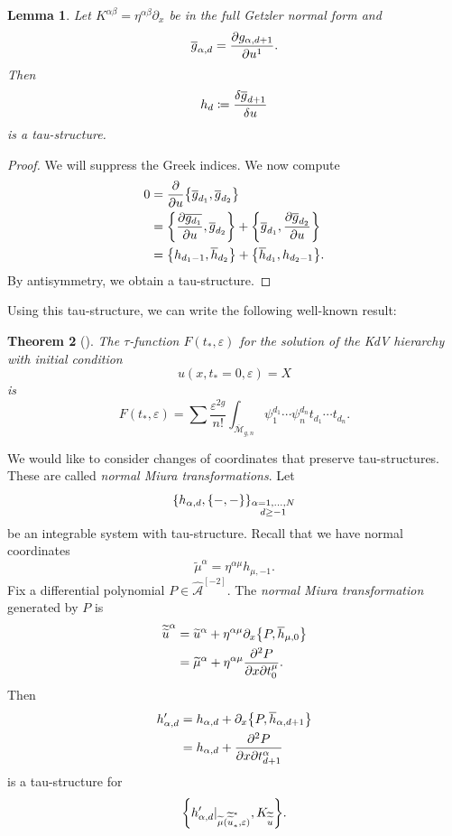 \documentclass[leqno, openany]{memoir}
\newtheorem{thm}{Theorem}[section]
\newtheorem{lem}[thm]{Lemma}
\theoremstyle{definition}
\theoremstyle{remark}
\theoremstyle{plain}
\theoremstyle{definition}
\theoremstyle{remark}
\newcommand{\ep}{\varepsilon}
\newcommand{\mc}[1]{\mathcal{#1}}
\newcommand{\ol}[1]{\overline{#1}}
\newcommand{\wt}[1]{\widetilde{#1}}
\newcommand{\wh}[1]{\widehat{#1}}
\begin{document}
\begin{lem}
    Let $K^{\alpha\beta} = \eta^{\alpha\beta} \partial_x$ be in the full Getzler normal form and
    \[ \ol{g}_{\alpha,d} = \pdv{g_{\alpha,d+1}}{u^1}. \]
    Then 
    \[ h_d \coloneqq \fdv{\ol{g}_{d+1}}{u} \]
    is a tau-structure.
\end{lem}

\begin{proof}
    We will suppress the Greek indices. We now compute
    \begin{align*}
        0 &= \pdv{u} \qty{\ol{g}_{d_1}, \ol{g}_{d_2}} \\
        &= \qty{\pdv{\ol{g_{d_1}}}{u}, \ol{g}_{d_2}} + \qty{\ol{g}_{d_1}, \pdv{\ol{g}_{d_2}}{u}} \\
        &= \qty{h_{d_1-1}, \ol{h}_{d_2}} + \qty{\ol{h}_{d_1}, h_{d_2-1}}.
    \end{align*}
    By antisymmetry, we obtain a tau-structure.
\end{proof}

Using this tau-structure, we can write the following well-known result:
\begin{thm}[\cite{wittenconj}]
    The $\tau$-function $F(t_*, \ep)$ for the solution of the KdV hierarchy with initial condition
    \[ u(x, t_* = 0, \ep) = X \]
    is
    \[ F(t_*, \ep) = \sum \frac{\ep^{2g}}{n!} \int_{\ol{\mc{M}}_{g, n}} \psi_1^{d_1} \cdots \psi_n^{d_n} t_{d_1} \cdots t_{d_n}. \]
\end{thm}

We would like to consider changes of coordinates that preserve tau-structures. These are called \textit{normal Miura transformations}. Let 
\[ \qty{h_{\alpha,d}, \qty{-,-}}_{\substack{\alpha = 1,\ldots,N \\ d \geq -1}} \]
be an integrable system with tau-structure. Recall that we have normal coordinates
\[ \wt{\mu}^{\alpha} = \eta^{\alpha \mu} h_{\mu,-1}. \]
Fix a differential polynomial $P \in \wh{\mc{A}}^{[-2]}$. The \textit{normal Miura transformation} generated by $P$ is
\begin{align*}
    \wt{\wt{u}}^{\alpha} &= \wt{u}^{\alpha} + \eta^{\alpha \mu} \partial_x \qty{P, \ol{h}_{\mu, 0}} \\
    &= \wt{\mu}^{\alpha} + \eta^{\alpha \mu} \pdv{P}{x}{t_0^{\mu}}.
\end{align*}
Then
\begin{align*}
    h'_{\alpha,d} &= h_{\alpha,d} + \partial_x \qty{P, \ol{h}_{\alpha,d+1}} \\
    &= h_{\alpha,d} + \pdv{P}{x}{t_{d+1}^{\alpha}}
\end{align*}
is a tau-structure for
\[ \qty{h'_{\alpha, d} |_{\wt{\mu}(\wt{\wt{u}}_*^*, \ep)}, K_{\wt{\wt{u}}}}. \]
\end{document}
